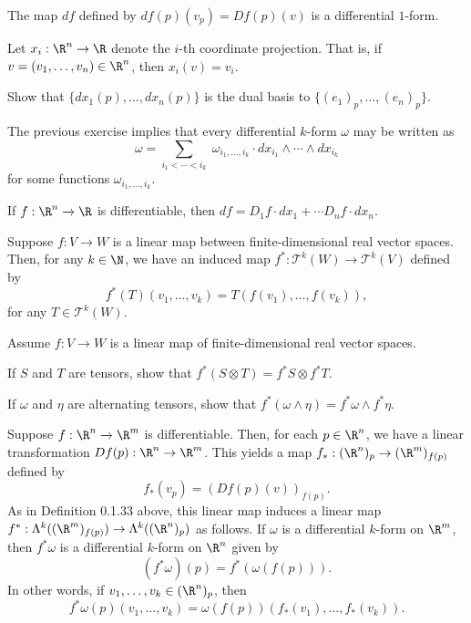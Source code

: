 \documentclass{book}
\begin{document}
\begin{exercise}
The map $df$ defined by $df(p)(v_p)=Df(p)(v)$ is a differential $1$-form.
\end{exercise}

\begin{definition}
Let $x_i:\R^n\to\R$ denote the $i$-th coordinate projection.  That is,
if $v=(v_1, \ldots, v_n)\in\R^n$, then $x_i(v)=v_i$.
\end{definition}

\begin{exercise}
Show that $\{dx_1(p), \ldots, dx_n(p)\}$ is the dual basis to 
$\{(e_1)_p, \ldots, (e_n)_p\}$.
\end{exercise}

\begin{remark}
The previous exercise implies that every differential $k$-form $\omega$ may be written as
$$\omega =\sum_{i_1< \cdots < i_k}\; \omega_{i_1, \ldots, i_k}\cdot 
dx_{i_1}\wedge \cdots\wedge dx_{i_k}$$
for some functions $\omega_{i_1, \ldots, i_k}$.
\end{remark}

\begin{theorem}
If $f:\R^n\to\R$ is differentiable, then $df=D_1f\cdot dx_1+\cdots D_nf\cdot dx_n$.
\end{theorem}

\pagebreak
\begin{definition}
Suppose $f:V\to W$ is a linear map between finite-dimensional real vector spaces.
Then, for any $k\in\N$, we have an induced map $f^*:\mathcal{T}^k(W)\to\mathcal{T}^k(V)$ 
defined by $$f^*(T)(v_1, \ldots, v_k)=T(f(v_1), \ldots, f(v_k)),$$
for any $T\in\mathcal{T}^k(W)$.
\end{definition}

\begin{exercise}  Assume $f:V\to W$ is a linear map of finite-dimensional real vector spaces.
\begin{exerenm}
\item
If $S$ and $T$ are tensors, show that $f^*(S\otimes T)=f^*S\otimes f^*T$.

\item
If $\omega$ and $\eta$ are alternating tensors, 
show that $f^*(\omega\wedge\eta)=f^*\omega\wedge f^*\eta$.
\end{exerenm}
\end{exercise}

\begin{definition}
Suppose $f:\R^n\to \R^m$ is differentiable.
Then, for each $p\in\R^n$, we have a linear transformation $Df(p):\R^n\to\R^m$.
This yields a map $f_*:(\R^n)_p\to (\R^m)_{f(p)}$ defined by
$$f_*(v_p)=(Df(p)(v))_{f(p)}.$$
As in Definition 0.1.33 above, this linear map induces a linear map 
$f^*:\Lambda^k((\R^m)_{f(p)})\to\Lambda^k((\R^n)_p)$ as follows.  
If $\omega$ is a differential $k$-form on $\R^m$, then $f^*\omega$ is a differential
$k$-form on $\R^n$ given by 
$$(f^*\omega)(p)=f^*(\omega (f(p))).$$
In other words, if $v_1, \ldots, v_k\in (\R^n)_p$, then
$$f^*\omega (p)(v_1, \ldots, v_k)=\omega (f(p))(f_*(v_1), \ldots, f_*(v_k)).$$
\end{definition}
\end{document}
